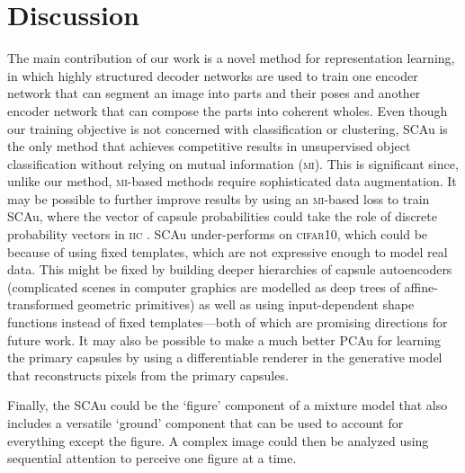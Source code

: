 \section{Discussion}
\label{sec:sca_discussion}

The main contribution of our work is a novel method for representation learning, in which highly structured decoder networks are used to train one encoder network that can segment an image into parts and their poses and another encoder network that can compose the parts into coherent wholes.
Even though our training objective is not concerned with classification or clustering,
\gls{SCAu} is the only method that achieves competitive results in unsupervised object classification without relying on mutual information (\textsc{mi}).
This is significant since, unlike our method, \textsc{mi}-based methods require sophisticated data augmentation.
It may be possible to further improve results by using an \textsc{mi}-based loss to train \gls{SCAu}, where the vector of capsule probabilities could take the role of discrete probability vectors in \textsc{iic} \citep{Ji2018iic}.
\gls{SCAu} under-performs on \textsc{cifar10}, which could be because of using fixed templates, which are not expressive enough to model real data.
This might be fixed by building deeper hierarchies of capsule autoencoders (\!\eg complicated scenes in computer graphics are modelled as deep trees of affine-transformed geometric primitives) as well as using input-dependent shape functions instead of fixed templates---both of which are promising directions for future work.
It may also be possible to make a much better \gls{PCAu} for learning the primary capsules by using a differentiable renderer in the generative model that reconstructs pixels from the primary capsules.

Finally, the \gls{SCAu} could be the `figure' component of a mixture model that also includes a versatile `ground' component that can be used to account for everything except the figure.  A complex image could then be analyzed using sequential attention to perceive one figure at a time. 